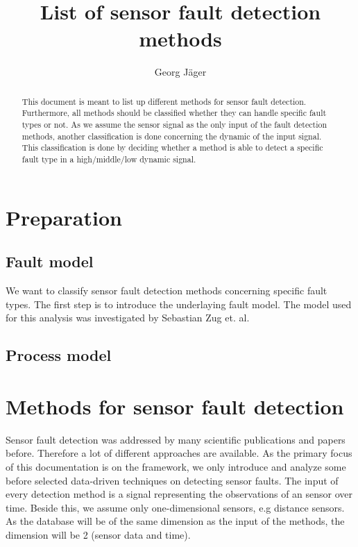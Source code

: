 \documentclass[a4paper,11pt]{article}
\title{List of sensor fault detection methods}
\author{Georg Jäger}
\begin{document}
\maketitle


\begin{abstract}
 This document is meant to list up different methods for sensor fault detection. Furthermore, all methods should be classified whether they can handle specific fault types or not. As we assume the sensor signal as the only input of the fault detection methods, another classification is done concerning the dynamic of the input signal. This classification is done by deciding whether a method is able to detect a specific fault type in a high/middle/low dynamic signal. 
\end{abstract}

\tableofcontents
\section{Preparation}
 
\subsection{Fault model}  
  We want to classify sensor fault detection methods concerning specific fault types. The first step is to introduce the underlaying fault model. The model used for this analysis was investigated by Sebastian Zug et. al. %
  

\subsection{Process model}


\section{Methods for sensor fault detection}

Sensor fault detection was addressed by many scientific publications and papers before. Therefore a lot of different approaches are available. As the primary focus of this documentation is on the framework, we only introduce and analyze some before selected data-driven techniques on detecting sensor faults. The input of every detection method is a signal representing the observations of an sensor over time. Beside this, we assume only one-dimensional sensors, e.g distance sensors. As the database will be of the same dimension as the input of the methods, the dimension will be 2 (sensor data and time). 
\end{document}
